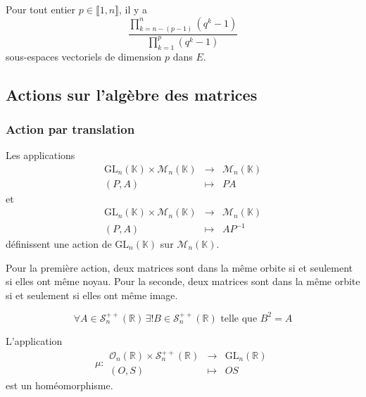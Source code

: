 	\begin{application}
		Pour tout entier $p \in \llbracket 1, n \rrbracket$, il y a
		\[ \frac{\prod_{k=n-(p-1)}^{n} (q^k - 1)}{\prod_{k=1}^{p} (q^k - 1)} \]
		sous-espaces vectoriels de dimension $p$ dans $E$.
	\end{application}
	
	\subsection{Actions sur l'algèbre des matrices}
	
	\subsubsection{Action par translation}
	
	
	\begin{proposition}
		Les applications
		\[
		\begin{array}{ccc}
			\mathrm{GL}_n(\mathbb{K}) \times \mathcal{M}_n(\mathbb{K}) &\rightarrow& \mathcal{M}_n(\mathbb{K}) \\
			(P, A) &\mapsto& PA
		\end{array}
		\]
		et
		\[
		\begin{array}{ccc}
			\mathrm{GL}_n(\mathbb{K}) \times \mathcal{M}_n(\mathbb{K}) &\rightarrow& \mathcal{M}_n(\mathbb{K}) \\
			(P, A) &\mapsto& AP^{-1}
		\end{array}
		\]
		définissent une action de $\mathrm{GL}_n(\mathbb{K})$ sur $\mathcal{M}_n(\mathbb{K})$.
	\end{proposition}
	
	\begin{remark}
		Pour la première action, deux matrices sont dans la même orbite si et seulement si elles ont même noyau. Pour la seconde, deux matrices sont dans la même orbite si et seulement si elles ont même image.
	\end{remark}
	
	
	\begin{lemma}
		\[ \forall A \in \mathcal{S}_n^{++}(\mathbb{R}) \, \exists! B \in \mathcal{S}_n^{++}(\mathbb{R}) \text{ telle que } B^2 = A \]
	\end{lemma}
	
	
	\begin{theorem}
		L'application
		\[ \mu :
		\begin{array}{ccc}
			\mathcal{O}_n(\mathbb{R}) \times \mathcal{S}_n^{++}(\mathbb{R}) &\rightarrow& \mathrm{GL}_n(\mathbb{R}) \\
			(O, S) &\mapsto& OS
		\end{array}
		\]
		est un homéomorphisme.
	\end{theorem}
	
